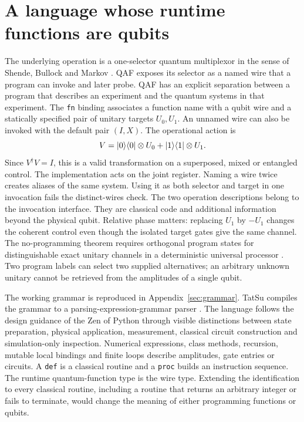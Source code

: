 \section{A language whose runtime functions are qubits}
The underlying operation is a one-selector quantum multiplexor in the sense of Shende, Bullock and Markov \cite{shende}. QAF exposes its selector as a named wire that a program can invoke and later probe.
QAF has an explicit separation between a program that describes an experiment and the quantum systems in that experiment. The \texttt{fn} binding associates a function name with a qubit wire and a statically specified pair of unitary targets $U_0,U_1$. An unnamed wire can also be invoked with the default pair $(I,X)$. The operational action is
\[
 V=\lvert 0\rangle\langle 0\rvert\otimes U_0+\lvert 1\rangle\langle 1\rvert\otimes U_1 .
\]
Since $V^\dagger V=I$, this is a valid transformation on a superposed, mixed or entangled control. The implementation acts on the joint register. Naming a wire twice creates aliases of the same system. Using it as both selector and target in one invocation fails the distinct-wires check. The two operation descriptions belong to the invocation interface. They are classical code and additional information beyond the physical qubit. Relative phase matters: replacing $U_1$ by $-U_1$ changes the coherent control even though the isolated target gates give the same channel. The no-programming theorem requires orthogonal program states for distinguishable exact unitary channels in a deterministic universal processor \cite{noprogram}. Two program labels can select two supplied alternatives; an arbitrary unknown unitary cannot be retrieved from the amplitudes of a single qubit.

The working grammar is reproduced in Appendix~\ref{sec:grammar}. TatSu compiles the grammar to a parsing-expression-grammar parser \cite{tatsu}. The language follows the design guidance of the Zen of Python \cite{zen} through visible distinctions between state preparation, physical application, measurement, classical circuit construction and simulation-only inspection. Numerical expressions, class methods, recursion, mutable local bindings and finite loops describe amplitudes, gate entries or circuits. A \texttt{def} is a classical routine and a \texttt{proc} builds an instruction sequence. The runtime quantum-function type is the wire type. Extending the identification to every classical routine, including a routine that returns an arbitrary integer or fails to terminate, would change the meaning of either programming functions or qubits.

